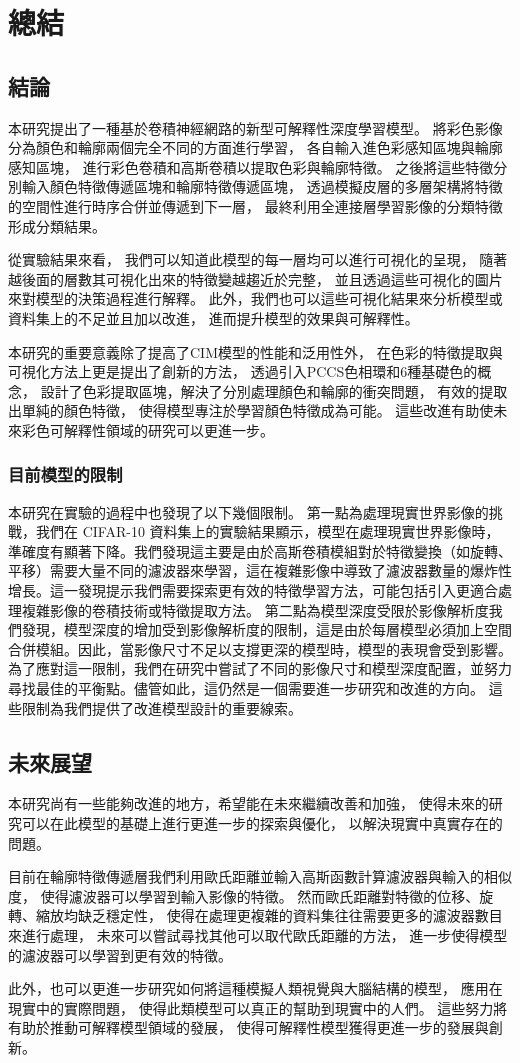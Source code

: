 \documentclass[class=NCU_thesis, crop=false]{standalone}
\begin{document}
\chapter{總結}
\section{結論}

本研究提出了一種基於卷積神經網路的新型可解釋性深度學習模型。
將彩色影像分為顏色和輪廓兩個完全不同的方面進行學習，
各自輸入進色彩感知區塊與輪廓感知區塊，
進行彩色卷積和高斯卷積以提取色彩與輪廓特徵。
之後將這些特徵分別輸入顏色特徵傳遞區塊和輪廓特徵傳遞區塊，
透過模擬皮層的多層架構將特徵的空間性進行時序合併並傳遞到下一層，
最終利用全連接層學習影像的分類特徵形成分類結果。

從實驗結果來看，
我們可以知道此模型的每一層均可以進行可視化的呈現，
隨著越後面的層數其可視化出來的特徵變越趨近於完整，
並且透過這些可視化的圖片來對模型的決策過程進行解釋。
此外，我們也可以這些可視化結果來分析模型或資料集上的不足並且加以改進，
進而提升模型的效果與可解釋性。

本研究的重要意義除了提高了CIM模型的性能和泛用性外，
在色彩的特徵提取與可視化方法上更是提出了創新的方法，
透過引入PCCS色相環和6種基礎色的概念，
設計了色彩提取區塊，解決了分別處理顏色和輪廓的衝突問題，
有效的提取出單純的顏色特徵，
使得模型專注於學習顏色特徵成為可能。
這些改進有助使未來彩色可解釋性領域的研究可以更進一步。

\subsection{目前模型的限制}
本研究在實驗的過程中也發現了以下幾個限制。
第一點為處理現實世界影像的挑戰，我們在 CIFAR-10 資料集上的實驗結果顯示，模型在處理現實世界影像時，準確度有顯著下降。我們發現這主要是由於高斯卷積模組對於特徵變換（如旋轉、平移）需要大量不同的濾波器來學習，這在複雜影像中導致了濾波器數量的爆炸性增長。這一發現提示我們需要探索更有效的特徵學習方法，可能包括引入更適合處理複雜影像的卷積技術或特徵提取方法。
第二點為模型深度受限於影像解析度我們發現，模型深度的增加受到影像解析度的限制，這是由於每層模型必須加上空間合併模組。因此，當影像尺寸不足以支撐更深的模型時，模型的表現會受到影響。為了應對這一限制，我們在研究中嘗試了不同的影像尺寸和模型深度配置，並努力尋找最佳的平衡點。儘管如此，這仍然是一個需要進一步研究和改進的方向。
這些限制為我們提供了改進模型設計的重要線索。

\section{未來展望}
本研究尚有一些能夠改進的地方，希望能在未來繼續改善和加強，
使得未來的研究可以在此模型的基礎上進行更進一步的探索與優化，
以解決現實中真實存在的問題。

目前在輪廓特徵傳遞層我們利用歐氏距離並輸入高斯函數計算濾波器與輸入的相似度，
使得濾波器可以學習到輸入影像的特徵。
然而歐氏距離對特徵的位移、旋轉、縮放均缺乏穩定性，
使得在處理更複雜的資料集往往需要更多的濾波器數目來進行處理，
未來可以嘗試尋找其他可以取代歐氏距離的方法，
進一步使得模型的濾波器可以學習到更有效的特徵。

此外，也可以更進一步研究如何將這種模擬人類視覺與大腦結構的模型，
應用在現實中的實際問題，
使得此類模型可以真正的幫助到現實中的人們。
這些努力將有助於推動可解釋模型領域的發展，
使得可解釋性模型獲得更進一步的發展與創新。
\end{document}
